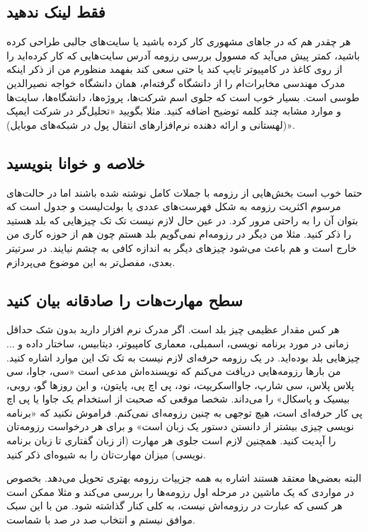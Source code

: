 \subsection*{فقط لینک ندهید}
هر چقدر هم که در جاهای مشهوری کار کرده باشید یا سایت‌های جالبی طراحی کرده باشید، کمتر پیش می‌آید که مسوول بررسی رزومه آدرس سایت‌هایی که کار کرده‌اید را از روی کاغذ در کامپیوتر تایپ کند یا حتی سعی کند بفهمد منظورم من از ذکر اینکه مدرک مهندسی مخابرات‌ام را از دانشگاه
گرفته‌ام، همان دانشگاه خواجه نصیرالدین طوسی است. بسیار خوب است که جلوی اسم شرکت‌ها، پروژه‌ها،‌ دانشگاه‌ها، سایت‌ها و موارد مشابه چند کلمه توضیح اضافه کنید. مثلا بگویید «تحلیل‌گر در شرکت ایمپک (لهستانی و ارائه دهنده نرم‌افزارهای انتقال پول در شبکه‌های موبایل)».
\subsection*{خلاصه و خوانا بنویسید}
حتما خوب است بخش‌هایی از رزومه با جملات کامل نوشته شده باشند اما در حالت‌های مرسوم اکثریت رزومه به شکل فهرست‌های عددی یا بولت‌لیست و جدول است که بتوان آن را به راحتی مرور کرد. در عین حال لازم نیست تک تک چیزهایی که بلد هستید را ذکر کنید. مثلا من دیگر در رزومه‌ام نمی‌گویم
بلد هستم چون هم از حوزه کاری من خارج است و هم باعث می‌شود چیزهای دیگر به اندازه کافی به چشم نیایند. در سرتیتر بعدی، مفصل‌تر به این موضوع می‌پردازم.
\subsection*{سطح مهارت‌هات را صادقانه بیان کنید}
هر کس مقدار عظیمی چیز بلد است. اگر مدرک نرم افزار دارید بدون شک حداقل زمانی در مورد برنامه نویسی، اسمبلی، معماری کامپیوتر، دیتابیس، ساختار داده و ... چیزهایی بلد بوده‌اید. در یک رزومه حرفه‌ای لازم نیست به تک تک این موارد اشاره کنید. من بارها رزومه‌هایی دریافت می‌کنم که نویسنده‌اش مدعی است «سی، جاوا، سی پلاس پلاس، سی شارپ، جاوااسکریپت، نود، پی اچ پی، پایتون، و این روزها گو، روبی، بیسیک و پاسکال» را می‌داند. شخصا موقعی که صحبت از استخدام یک جاوا یا پی اچ پی کار حرفه‌ای است، هیچ توجهی به چنین رزومه‌ای نمی‌کنم. فراموش نکنید که «برنامه نویسی چیزی بیشتر از دانستن دستور یک زبان است» و برای هر درخواست رزومه‌تان را آپدیت کنید. همچنین لازم است جلوی هر مهارت (از زبان گفتاری تا زبان برنامه نویسی) میزان مهارت‌تان را به شیوه‌ای ذکر کنید.
\begin{mybox}
البته بعضی‌ها معتقد هستند اشاره به همه جزییات رزومه بهتری تحویل می‌دهد. بخصوص در مواردی که یک ماشین در مرحله اول رزومه‌ها را بررسی می‌کند و مثلا ممکن است هر کسی که عبارت
در رزومه‌اش نیست، به کلی کنار گذاشته شود. من با این سبک موافق نیستم و انتخاب صد در صد با شماست.
\end{mybox}
